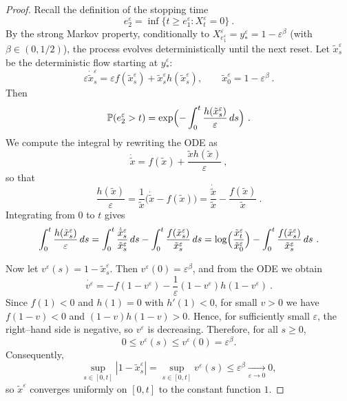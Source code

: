 \documentclass[reqno, 12pt, a4paper]{amsart}
\theoremstyle{plain}
\theoremstyle{definition}
\begin{document}
\begin{proof}
Recall the definition of the stopping time
\[
e_2^\varepsilon = \inf\{ t \ge e_1^\varepsilon : X_t^\varepsilon = 0 \} \ .
\]
By the strong Markov property, conditionally to \( X_{e_1^\varepsilon}^\varepsilon = y_*^\varepsilon = 1-\varepsilon^\beta \) (with \(\beta\in(0,1/2)\)), the process evolves deterministically until the next reset. Let \(\tilde{x}_s^\varepsilon\) be the deterministic flow starting at \(y_*^\varepsilon\):
\[
\varepsilon \dot{\tilde{x}}_s^\varepsilon = \varepsilon f(\tilde{x}_s^\varepsilon) + \tilde{x}_s^\varepsilon h(\tilde{x}_s^\varepsilon), \qquad \tilde{x}_0^\varepsilon = 1-\varepsilon^\beta \  .
\]
Then
\[
\mathbb{P}(e_2^\varepsilon > t) = \exp\Bigl( -\int_0^t \frac{h(\tilde{x}_s^\varepsilon)}{\varepsilon} \, ds \Big) \ .
\]
We compute the integral by rewriting the ODE as
\[
\dot{\tilde{x}} = f(\tilde{x}) + \frac{\tilde{x} h(\tilde{x})}{\varepsilon} \ ,
\]
so that
\[
\frac{h(\tilde{x})}{\varepsilon} = \frac{1}{\tilde{x}} \bigl( \dot{\tilde{x}} - f(\tilde{x}) \bigr) = \frac{\dot{\tilde{x}}}{\tilde{x}} - \frac{f(\tilde{x})}{\tilde{x}}\  .
\]
Integrating from \(0\) to \(t\) gives
\begin{equation}
\label{eq:1ds}
\begin{split}
\int_0^t \frac{h(\tilde{x}_s^\varepsilon)}{\varepsilon} \, ds = \int_0^t \frac{\dot{\tilde{x}}_s^\varepsilon}{\tilde{x}_s^\varepsilon} \, ds - \int_0^t \frac{f(\tilde{x}_s^\varepsilon)}{\tilde{x}_s^\varepsilon} \, ds = \log\Bigl( \frac{\tilde{x}_t^\varepsilon}{\tilde{x}_0^\varepsilon} \Bigr) - \int_0^t \frac{f(\tilde{x}_s^\varepsilon)}{\tilde{x}_s^\varepsilon} \, ds \ . 
\end{split}
\end{equation}

\medskip
Now let \( v^\varepsilon (s) = 1 - \tilde{x}_s^\varepsilon \). Then \( v^\varepsilon (0) = \varepsilon^\beta \), and from the ODE we obtain
\[
\dot{v^\varepsilon} = -f(1-v^\varepsilon) - \frac{1}{\varepsilon}(1-v^\varepsilon)h(1-v^\varepsilon) \ .
\]
Since \( f(1)<0 \) and \( h(1)=0 \) with \( h'(1)<0 \), for small \( v>0 \) we have \( f(1-v)<0 \) and \( (1-v)h(1-v)>0 \). Hence, for sufficiently small \( \varepsilon \), the right--hand side is negative, so $v^\varepsilon$ is decreasing. Therefore, for all \( s \ge 0 \),
\[
0 \le v^\varepsilon (s) \le v^\varepsilon (0) = \varepsilon^\beta .
\]
Consequently,
\[
\sup_{s\in[0,t]} |1-\tilde{x}_s^\varepsilon| = \sup_{s\in[0,t]} v^\varepsilon (s) \le \varepsilon^\beta \xrightarrow[\varepsilon\to0]{} 0,
\]
so $\tilde{x}^\varepsilon$ converges uniformly on \([0,t]\) to the constant function $1$.


\end{proof}
\end{document}
